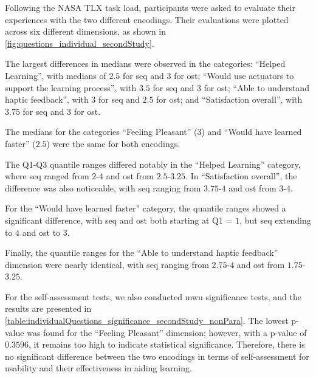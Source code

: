 Following the NASA TLX task load, participants were asked to evaluate their experiences with the two different encodings. Their evaluations were plotted across six different dimensions, as shown in \autoref{fig:questions_individual_secondStudy}.

The largest differences in medians were observed in the categories: \enquote{Helped Learning}, with medians of $2.5$ for \gls{seq} and $3$ for \gls{ost}; \enquote{Would use actuators to support the learning process}, with $3.5$ for \gls{seq} and $3$ for \gls{ost}; \enquote{Able to understand haptic feedback}, with $3$ for \gls{seq} and $2.5$ for \gls{ost}; and \enquote{Satisfaction overall}, with $3.75$ for \gls{seq} and $3$ for \gls{ost}. 

The medians for the categories \enquote{Feeling Pleasant} ($3$) and \enquote{Would have learned faster} ($2.5$) were the same for both encodings. 

The Q1-Q3 quantile ranges differed notably in the \enquote{Helped Learning} category, where \gls{seq} ranged from $2$-$4$ and \gls{ost} from $2.5$-$3.25$. In \enquote{Satisfaction overall}, the difference was also noticeable, with \gls{seq} ranging from $3.75$-$4$ and \gls{ost} from $3$-$4$. 

For the \enquote{Would have learned faster} category, the quantile ranges showed a significant difference, with \gls{seq} and \gls{ost} both starting at Q1 = $1$, but \gls{seq} extending to $4$ and \gls{ost} to $3$. 

Finally, the quantile ranges for the \enquote{Able to understand haptic feedback} dimension were nearly identical, with \gls{seq} ranging from $2.75$-$4$ and \gls{ost} from $1.75$-$3.25$.



For the self-assessment tests, we also conducted \gls{mwu} significance tests, and the results are presented in \autoref{table:individualQuestions_significance_secondStudy_nonPara}.
The lowest p-value was found for the \enquote{Feeling Pleasant} dimension; however, with a p-value of $0.3596$, it remains too high to indicate statistical significance.
Therefore, there is no significant difference between the two encodings in terms of self-assessment for usability and their effectiveness in aiding learning.

